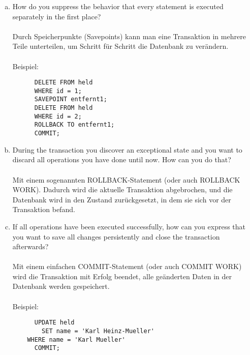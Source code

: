 \documentclass[11pt,a4paper,DIV=9]{scrartcl}
\begin{document}
      \begin{enumerate}[a.]
      \item How do you suppress the behavior that every statement is executed separately in the first place? \\\\
      Durch Speicherpunkte (Savepoints) kann man eine Transaktion in mehrere Teile unterteilen, um Schritt f\"ur Schritt die Datenbank zu ver\"andern. \\\\
      Beispiel:
      \begin{lstlisting}
      DELETE FROM held
      WHERE id = 1;  
      SAVEPOINT entfernt1;   
      DELETE FROM held
      WHERE id = 2;    
      ROLLBACK TO entfernt1;
      COMMIT;
      \end{lstlisting}
      \item During the transaction you discover an exceptional state and you want to discard all operations you have done until now. How can you do that? \\\\
      Mit einem sogenannten ROLLBACK-Statement (oder auch ROLLBACK WORK). Dadurch wird die aktuelle Transaktion abgebrochen, und die Datenbank wird in den Zustand zur\"uckgesetzt, in dem sie sich vor der Transaktion befand.     
      \item If all operations have been executed successfully, how can you express that you want to save all changes persistently and close the transaction afterwards? \\\\
      Mit einem einfachen COMMIT-Statement (oder auch COMMIT WORK) wird die Transaktion mit Erfolg beendet, alle ge\"anderten Daten in der Datenbank werden gespeichert. \\\\
      Beispiel:
      \begin{lstlisting}
      UPDATE held
      	SET name = 'Karl Heinz-Mueller'
	WHERE name = 'Karl Mueller'
      COMMIT;
      \end{lstlisting}
      \end{enumerate}
\end{document}
